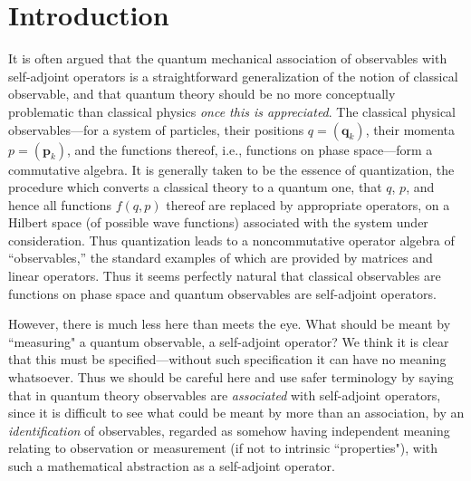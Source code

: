\documentclass[12pt]{article}
\begin{document}
\maketitle

\tableofcontents



\section{Introduction}
\setcounter{equation}{0}

It is often argued that the quantum mechanical association of
observables with self-adjoint operators is a straightforward
generalization of the notion of classical observable, and that quantum
theory should be no more conceptually problematic than classical
physics {\it once this is appreciated}.  The classical physical
observables---for a system of particles, their positions
$q=(\mathbf{q}_k)$, their momenta $p=(\mathbf{p}_k)$, and the
functions thereof, i.e., functions on phase space---form a commutative
algebra.  It is generally taken to be the essence of quantization, the
procedure which converts a classical theory to a quantum one, that
\(q\), \(p\), and hence all functions \(f(q,p)\) thereof are replaced
by appropriate operators, on a Hilbert space (of possible wave
functions) associated with the system under consideration.  Thus
quantization leads to a noncommutative operator algebra of
``observables,'' the standard examples of which are provided by
matrices and linear operators.  Thus it seems perfectly natural that
classical observables are functions on phase space and quantum
observables are self-adjoint operators.

However, there is much less here than meets the eye.  What should be
meant by ``measuring" a quantum observable, a self-adjoint operator?
We think it is clear that this must be specified---without such
specification it can have no meaning whatsoever. Thus we should be
careful here and use safer terminology by saying that in quantum
theory observables are {\it associated} with self-adjoint operators,
since it is difficult to see what could be meant by more than an
association, by an {\it identification} of observables, regarded as
somehow having independent meaning relating to observation or
measurement (if not to intrinsic ``properties"), with such a
mathematical abstraction as a self-adjoint operator.
\end{document}
